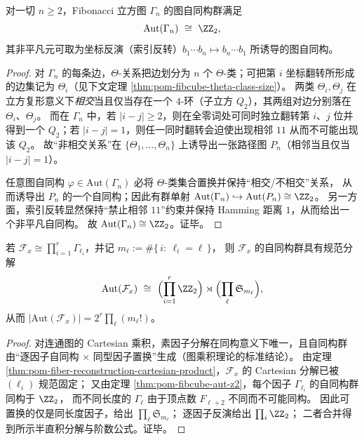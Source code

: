 \begin{theorem}\label{thm:pom-fibcube-aut-z2}
对一切 \(n\ge 2\)，Fibonacci 立方图 \(\Gamma_n\) 的图自同构群满足
\[
\mathrm{Aut}(\Gamma_n)\ \cong\ \ZZ_2,
\]
其非平凡元可取为坐标反演（索引反转）\(b_1\cdots b_n\mapsto b_n\cdots b_1\) 所诱导的图自同构。
\end{theorem}
\begin{proof}
对 \(\Gamma_n\) 的每条边，\(\Theta\)-关系把边划分为 \(n\) 个 \(\Theta\)-类；可把第 \(i\) 坐标翻转所形成的边集记为 \(\Theta_i\)（见下文定理 \ref{thm:pom-fibcube-theta-class-size}）。
两类 \(\Theta_i,\Theta_j\) 在立方复形意义下\emph{相交}当且仅当存在一个 \(4\)-环（子立方 \(Q_2\)），其两组对边分别落在 \(\Theta_i\)、\(\Theta_j\)。
而在 \(\Gamma_n\) 中，若 \(|i-j|\ge 2\)，则在全零词处可同时独立翻转第 \(i\)、\(j\) 位并得到一个 \(Q_2\)；若 \(|i-j|=1\)，则任一同时翻转会迫使出现相邻 \(11\) 从而不可能出现该 \(Q_2\)。
故“非相交关系”在 \(\{\Theta_1,\dots,\Theta_n\}\) 上诱导出一张路径图 \(P_n\)（相邻当且仅当 \(|i-j|=1\)）。
\par
任意图自同构 \(\varphi\in\mathrm{Aut}(\Gamma_n)\) 必将 \(\Theta\)-类集合置换并保持“相交/不相交”关系，
从而诱导出 \(P_n\) 的一个自同构；因此有群单射
\(
\mathrm{Aut}(\Gamma_n)\hookrightarrow \mathrm{Aut}(P_n)\cong \ZZ_2
\)。
另一方面，索引反转显然保持“禁止相邻 \(11\)”约束并保持 Hamming 距离 \(1\)，从而给出一个非平凡自同构。
故 \(\mathrm{Aut}(\Gamma_n)\cong\ZZ_2\)。证毕。
\end{proof}

\begin{theorem}[一般纤维重构图的自同构群]\label{thm:pom-fiber-reconstruction-aut-group}
若 \(\mathcal F_x\cong\prod_{i=1}^r\Gamma_{\ell_i}\)，并记
\(
m_\ell:=\#\{\,i:\ \ell_i=\ell\,\}
\)，
则 \(\mathcal F_x\) 的自同构群具有规范分解
\[
\mathrm{Aut}(\mathcal F_x)\ \cong\
\Bigl(\prod_{i=1}^r \ZZ_2\Bigr)\rtimes
\Bigl(\prod_{\ell}\mathfrak S_{m_\ell}\Bigr),
\]
从而
\(
|\mathrm{Aut}(\mathcal F_x)|=2^{r}\prod_{\ell}(m_\ell!)
\)。
\end{theorem}
\begin{proof}
对连通图的 Cartesian 乘积，素因子分解在同构意义下唯一，且自同构群由“逐因子自同构 \(\times\) 同型因子置换”生成（图乘积理论的标准结论）。
由定理 \ref{thm:pom-fiber-reconstruction-cartesian-product}，\(\mathcal F_x\) 的 Cartesian 分解已被 \((\ell_i)\) 规范固定；
又由定理 \ref{thm:pom-fibcube-aut-z2}，每个因子 \(\Gamma_{\ell_i}\) 的自同构群同构于 \(\ZZ_2\)，
而不同长度的 \(\Gamma_\ell\) 由于顶点数 \(F_{\ell+2}\) 不同而不可能同构。
因此可置换的仅是同长度因子，给出 \(\prod_\ell\mathfrak S_{m_\ell}\)；
逐因子反演给出 \(\prod_i\ZZ_2\)；
二者合并得到所示半直积分解与阶数公式。证毕。
\end{proof}


